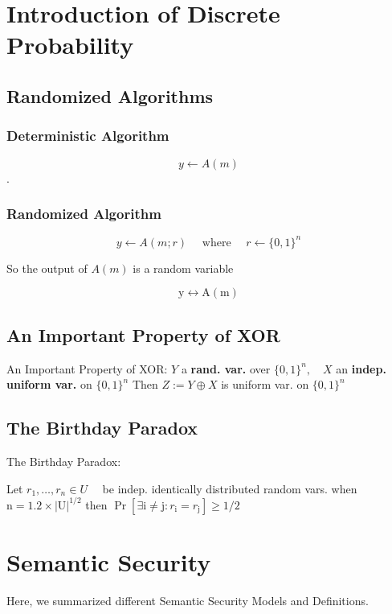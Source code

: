 \section{Introduction of Discrete Probability}


\subsection{Randomized Algorithms}

\subsubsection{Deterministic Algorithm}

$$y \leftarrow A(m)$$. 

\subsubsection{Randomized Algorithm}

$$
y \longleftarrow A(m ; r) \quad \text { where } \quad r \longleftarrow\{0,1\}^{n}
$$

So the output of $A(m)$ is a random variable

$$
\mathrm{y} \leftrightarrow \mathrm{A}(\mathrm{m})
$$



\subsection{An Important Property of XOR}

\begin{theorem}   An Important Property of XOR:
    $Y$ a \textbf{rand. var.} over $\{0,1\}^{n}, \quad X$ an \textbf{indep. uniform var.} on $\{0,1\}^{n}$
    Then $Z:=Y \oplus X$ is uniform var. on $\{0,1\}^{n}$
    
\end{theorem}


\subsection{The Birthday Paradox}

\begin{theorem}  The Birthday Paradox:

    Let $r_{1}, \ldots, r_{n} \in U \quad$ be indep. identically distributed random vars.
    when $\mathrm{n}=1.2 \times|\mathrm{U}|^{1 / 2}$ then $\operatorname{Pr}\left[\exists \mathrm{i} \neq \mathrm{j}: r_{\mathrm{i}}=r_{\mathrm{j}}\right] \geq 1 / 2$
    
\end{theorem}

\section{Semantic Security}

Here, we summarized different Semantic Security Models and Definitions.